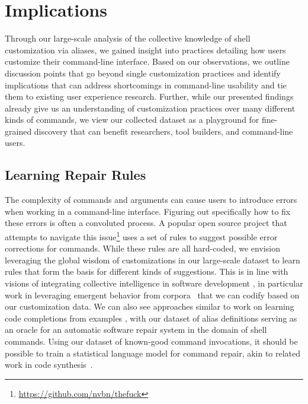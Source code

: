 \documentclass[smallextended,natbib]{svjour3}
\begin{document}
\section{Implications}

Through our large-scale analysis of the collective knowledge of shell customization via aliases,
we gained insight into practices detailing how users customize their command-line interface.
Based on our observations, we outline discussion points that go beyond single customization practices and identify implications that can address shortcomings in command-line usability and tie them to existing user experience research.
Further, while our presented findings already give us an understanding of customization practices over many different kinds of commands, we view our collected dataset as a playground for fine-grained discovery that can benefit researchers, tool builders, and command-line users.

\subsection{Learning Repair Rules}
\label{sec:repair-rules}

The complexity of commands and arguments can cause users to introduce errors when working in a command-line interface.
Figuring out specifically how to fix these errors is often a convoluted process.
A popular open source project that attempts to navigate this issue\footnote{\url{https://github.com/nvbn/thefuck}} uses a set of rules to suggest possible error corrections for commands.
While these rules are all hard-coded, we envision leveraging the global wisdom of customizations in our large-scale dataset to learn rules that form the basis for different kinds of suggestions.
This is in line with visions of integrating collective intelligence in software development \citep{bruch:10}, in particular work in leveraging emergent behavior from corpora~\citep{fast:14} that we can codify based on our customization data.
We can also see approaches similar to work on learning code completions from examples \citep{bruch:09}, with our dataset of alias definitions serving as an oracle for an automatic software repair system \citep{monperrus:18} in the domain of shell commands.
Using our dataset of known-good command invocations, it should be possible to train a statistical language model for command repair, akin to related work in code synthesis~\citep{raychev2014completion}.
\end{document}
